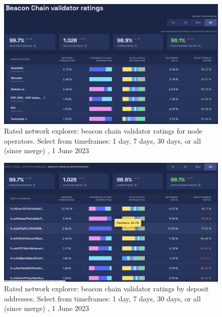 \documentclass[UTF8]{article}
\begin{document}
\begin{figure}[htbp]
\begin{center}
\includegraphics[width=\linewidth]{images/ratedentity2}
\caption{Rated network explorer: beacon chain validator ratings for node operators. Select from timeframes: 1 day, 7 days, 30 days, or all (since merge) , 1 June 2023}
\label{fig:ratedentity2}
\end{center}
\end{figure}

\begin{figure}[htbp]
\begin{center}
\includegraphics[width=\linewidth]{images/ratedentity3}
\caption{Rated network explorer: beacon chain validator ratings by deposit addresses. Select from timeframes: 1 day, 7 days, 30 days, or all (since merge) , 1 June 2023}
\label{fig:ratedentity3}
\end{center}
\end{figure}
\end{document}
